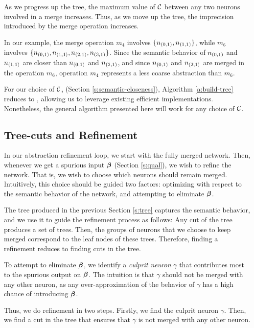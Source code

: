 As we progress up the tree, the maximum value of $\mathcal{C}$ between any two neurons
involved in a merge increases. Thus, as we move up the tree, the imprecision
introduced by the merge operation increases. 

In our example, the merge operation
$m_4$ involves $\{n_{(0,1)}, n_{(1,1)}\}$, while $m_6$ involves $\{n_{(0,1)},
n_{(1,1)}, n_{(2,1)}, n_{(3,1)}\}$. Since the semantic behavior of $n_{(0,1)}$
and $n_{(1,1)}$ are closer than $n_{(0,1)}$ and $n_{(2,1)}$, and since
$n_{(0,1)}$ and
$n_{(2,1)}$ are merged in the operation $m_6$, operation $m_4$
represents a less coarse abstraction than $m_6$.

For our choice of $\mathcal{C}$, (Section \ref{s:semantic-closeness}), Algorithm
\ref{a:build-tree} reduces to \hcluster, allowing us to leverage existing
efficient implementations. Nonetheless, the
general algorithm presented here will work for any choice of $\mathcal{C}$.

\subsection{Tree-cuts and Refinement}
\label{s:refinement}



In our abstraction refinement loop, we start with the fully merged network.
Then, whenever we get a spurious input $\boldsymbol{\beta}$ (Section \ref{s:qual}), we
wish to refine the network. That is, we wish to choose which
neurons should remain merged. Intuitively, this choice should be guided
two factors: optimizing with respect to the semantic behavior of the network,
and attempting to eliminate $\boldsymbol{\beta}$.

The tree produced in the previous Section \ref{s:tree} captures the semantic
behavior, and we use it to guide the refinement process as follows:
Any cut of the tree produces a set of trees. Then,  
the groups of neurons that we choose to keep merged correspond to the leaf nodes
of these trees. Therefore, finding a refinement reduces to finding cuts
in the tree.

To attempt to eliminate $\boldsymbol{\beta}$, we identify a \textit{culprit neuron}
$\gamma$ that contributes most to the spurious output on $\boldsymbol{\beta}$. The
intuition is that $\gamma$ should not be merged with any other neuron, as any
over-approximation of the behavior of $\gamma$ has a high chance of
introducing $\boldsymbol{\beta}$.

Thus, we do refinement in two steps. Firstly, we find the culprit neuron
$\gamma$. Then, we find a cut in the tree that ensures that $\gamma$ is not
merged with any other neuron.

